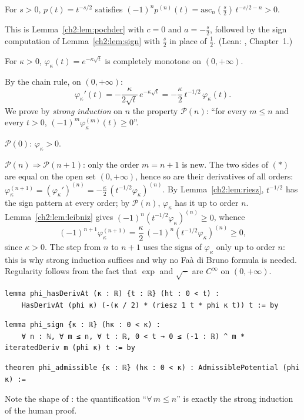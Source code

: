 \begin{lemma}[$t^{-s/2}$ is CM]\label{ch2:lem:riesz}
For $s>0$, $p(t)=t^{-s/2}$ satisfies $(-1)^np^{(n)}(t)=\mathrm{asc}_n(\tfrac s2)\,t^{-s/2-n}>0$.
\end{lemma}
\begin{humanproof}
This is Lemma~\ref{ch2:lem:pochder} with $c=0$ and $a=-\tfrac s2$, followed by the sign computation of Lemma~\ref{ch2:lem:sign}
with $\tfrac s2$ in place of $\tfrac12$. (Lean: , Chapter~1.)
\end{humanproof}

\begin{proposition}\label{ch2:prop:phi}
For $\kappa>0$, $\varphi_\kappa(t)=e^{-\kappa\sqrt t}$ is completely monotone on $(0,+\infty)$.
\end{proposition}
\begin{humanproof}
By the chain rule, on $(0,+\infty)$:
\[\varphi_\kappa'(t)=-\frac{\kappa}{2\sqrt t}\,e^{-\kappa\sqrt t}=-\frac\kappa2\,t^{-1/2}\,\varphi_\kappa(t).\tag{$\ast$}\]
We prove by \emph{strong induction} on $n$ the property $\mathcal P(n)$: ``for every $m\le n$ and every $t>0$,
$(-1)^m\varphi_\kappa^{(m)}(t)\ge0$''.

$\mathcal P(0)$: $\varphi_\kappa>0$.

$\mathcal P(n)\Rightarrow\mathcal P(n+1)$: only the order $m=n+1$ is new. The two sides of $(\ast)$ are equal on the
open set $(0,+\infty)$, hence so are their derivatives of all orders: $\varphi_\kappa^{(n+1)}=(\varphi_\kappa')^{(n)}
=-\frac\kappa2\,(t^{-1/2}\varphi_\kappa)^{(n)}$. By Lemma~\ref{ch2:lem:riesz}, $t^{-1/2}$ has the sign pattern at every
order; by $\mathcal P(n)$, $\varphi_\kappa$ has it up to order $n$. Lemma~\ref{ch2:lem:leibniz} gives
$(-1)^n(t^{-1/2}\varphi_\kappa)^{(n)}\ge0$, whence
\[(-1)^{n+1}\varphi_\kappa^{(n+1)}=\frac\kappa2\,(-1)^n(t^{-1/2}\varphi_\kappa)^{(n)}\ge0,\]
since $\kappa>0$. The step from $n$ to $n+1$ uses the signs of $\varphi_\kappa$ only up to order $n$: this is why strong
induction suffices and why no Faà di Bruno formula is needed. Regularity follows from the fact that
$\exp$ and $\sqrt{\,\cdot\,}$ are $C^\infty$ on $(0,+\infty)$.
\end{humanproof}
\begin{leanbox}
\begin{lstlisting}[style=chdeux]
lemma phi_hasDerivAt (κ : ℝ) {t : ℝ} (ht : 0 < t) :
    HasDerivAt (phi κ) (-(κ / 2) * (riesz 1 t * phi κ t)) t := by
\end{lstlisting}
\begin{lstlisting}[style=chdeux]
lemma phi_sign {κ : ℝ} (hκ : 0 < κ) :
    ∀ n : ℕ, ∀ m ≤ n, ∀ t : ℝ, 0 < t → 0 ≤ (-1 : ℝ) ^ m * iteratedDeriv m (phi κ) t := by
\end{lstlisting}
\begin{lstlisting}[style=chdeux]
theorem phi_admissible {κ : ℝ} (hκ : 0 < κ) : AdmissiblePotential (phi κ) :=
\end{lstlisting}
\end{leanbox}
\noindent Note the shape of : the quantification ``$\forall\,m\le n$'' is exactly the strong induction of
the human proof.

